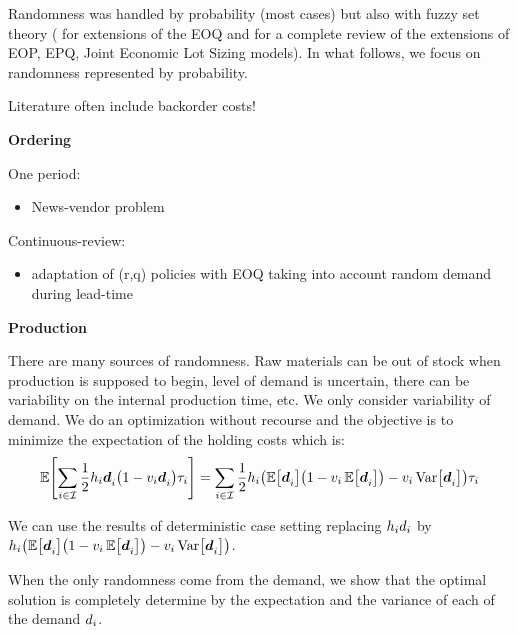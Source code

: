 Randomness was handled by probability (most cases) but also with fuzzy set theory (\eg \cite{Park1987,Lee1999,Wang2007} for extensions of the EOQ and \cite{Ziukov2015} for a complete review of the extensions of EOP, EPQ, Joint Economic Lot Sizing models). In what follows, we focus on randomness represented by probability.

Literature often include backorder costs!

\medskip

\textbf{Ordering}

One period:
\begin{itemize}
  \item News-vendor problem \cite{Edgeworth88,Arrow1951}
\end{itemize}

Continuous-review:
\begin{itemize}
  \item adaptation of (r,q) policies with EOQ taking into account random demand during lead-time \cite{Gallego1998}
\end{itemize}

\medskip

\textbf{Production}





There are many sources of randomness. Raw materials can be out of stock when production is supposed to begin, level of demand is uncertain, there can be variability on the internal production time, etc. We only consider variability of demand. We do an optimization without recourse and the objective is to minimize the expectation of the holding costs which is:
\begin{equation}
  \espe\sqbracket{\sum_{i\in\REF} \frac{1}{2}\holding_i\va\demand_i\bracket{1-\internal_i\va\demand_i}\cover_i}
  = 
  \sum_{i\in\REF} \frac{1}{2}\holding_i\bracket{\espe\sqbracket{\va\demand_i}\bracket{1-\internal_i\espe\sqbracket{\va\demand_i}}-\internal_i\vari\sqbracket{\va\demand_i}}\cover_i
\end{equation}

We can use the results of deterministic case setting replacing $h_id_i$ by $\holding_i\bracket{\espe\sqbracket{\va\demand_i}\bracket{1-\internal_i\espe\sqbracket{\va\demand_i}}-\internal_i\vari\sqbracket{\va\demand_i}}$.


When the only randomness come from the demand, we show that the optimal solution is completely determine by the expectation and the variance of each of the demand $d_i$.


